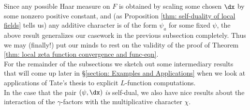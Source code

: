 \documentclass[11pt, x11names, openany]{book}
\begin{document}
Since any possible Haar measure on $F$ is obtained by scaling some chosen $\dx$ by some nonzero positive constant, and (as Proposition \ref{thm: self-duality of local fields} tells us) any additive character is of the form $\psi_a$ for some fixed $\psi$, the above result generalizes our casework in the previous subsection completely. Thus we may (finally!) put our minds to rest on the validity of the proof of Theorem \ref{thm: local zeta function convergence and func-eqn}.\\

For the remainder of the subsections we sketch out some intermediary results that will come up later in \S \ref{section: Examples and Applications} when we look at applications of Tate's thesis to explicit $L$-function computations.\\

In the case that the pair $(\psi, \dx)$ \textit{is} self-dual, we also have nice results about the interaction of the $\gamma$-factors with the multiplicative character $\chi$.
\end{document}
